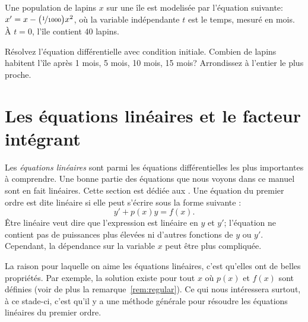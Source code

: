 \begin{exercise}
	Une population de lapins $x$ sur une île est modelisée par l'équation suivante:
	$x' = x- \bigl(\nicefrac{1}{1000} \bigr) x^2$,
	où la variable indépendante $t$ est le temps, mesuré en mois.
	À  $t=0$, l'île contient 40 lapins.
	\begin{tasks}
		\task Résolvez l'équation différentielle avec condition initiale.
		\task Combien de lapins habitent l'île après 1 mois, 5 mois, 10 mois, 15 mois?  Arrondissez à l'entier le plus proche.
	\end{tasks}
\end{exercise}


\sectionnewpage
\section{Les équations linéaires et le facteur intégrant}
\label{intfactor:section}


Les \emph{équations linéaires} sont parmi les équations différentielles les plus importantes à comprendre.
Une bonne partie des équations que nous voyons dans ce manuel sont en fait linéaires.
Cette section est dédiée aux \emph{}.
Une équation du premier ordre est dite linéaire si elle peut s'écrire sous la forme suivante :
\begin{equation} \label{lineq:eq1}
y' + p(x) y = f(x) .
\end{equation}
Être \og{}linéaire\fg{} veut dire que l'expression est linéaire en $y$ et $y'$;
l'équation ne contient pas de puissances plus élevées ni d'autres fonctions de $y$ ou $y'$.
Cependant, la dépendance sur la variable $x$ peut être plus compliquée.

La raison pour laquelle on aime les équations linéaires, c'est qu'elles ont de belles propriétés.
Par exemple, la solution existe pour tout $x$ où $p(x)$ et $f(x)$ sont définies (voir de plus la remarque~\ref{rem:regular}).
Ce qui nous intéressera surtout, à ce stade-ci, c'est qu'il y a une méthode générale pour résoudre les équations linéaires du premier ordre.

